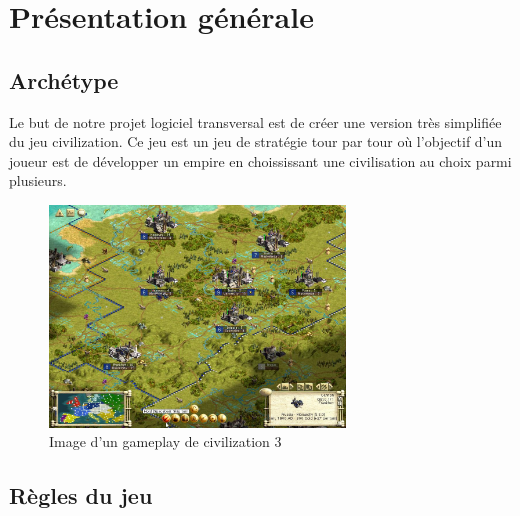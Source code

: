 \documentclass[12pt,a4paper]{article}
\begin{document}
\newpage

\tableofcontents
\thispagestyle{empty}
\setcounter{page}{0}

\newpage

\section{Présentation générale}

\subsection{Archétype}

Le but de notre projet logiciel transversal est de créer une version très simplifiée du jeu civilization. Ce jeu est un jeu de stratégie tour par tour où l'objectif d'un joueur est de développer un empire en choississant une civilisation au choix parmi plusieurs. 

\begin{figure}[!ht]
    \centering
    \includegraphics[width=0.7\textwidth]{civ3.png}
     \caption{Image d'un gameplay de civilization 3}
\end{figure}

\subsection{Règles du jeu}
\end{document}
